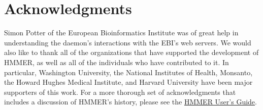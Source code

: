 \documentclass[notoc,justified]{tufte-book}    %
\begin{document}
\chapter{Acknowledgments}
Simon Potter of the European Bioinformatics Institute was of great help in understanding the daemon's interactions with the EBI's web servers.  We would also like to thank all of the organizations that have supported the development of HMMER, as well as all of the individuals who have contributed to it. In particular, Washington University, the National Institutes of Health, Monsanto, the Howard Hughes Medical Institute, and Harvard University have been major supporters of this work.  For a more thorough set of acknowledgments that includes a discussion of HMMER's history, please see the \underline{HMMER User's Guide}.

\label{manualend}

% 
\end{document}
